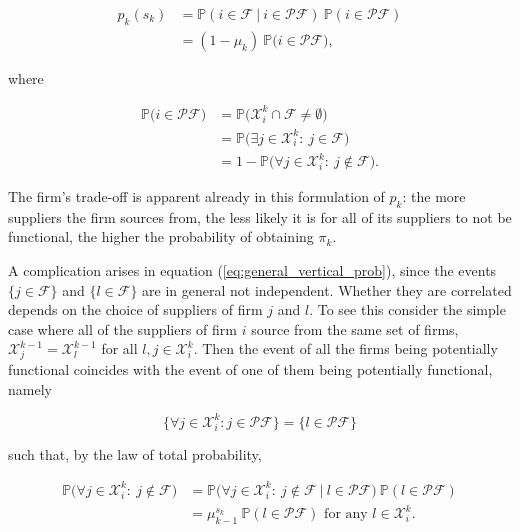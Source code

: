 \documentclass[american, abstract=on]{scrartcl}
\newcommand{\F}{\mathcal{F}}
\newcommand{\X}{\mathcal{X}}
\newcommand{\PF}{\mathcal{P} \F}
\renewcommand{\P}{\mathbb{P}}
\begin{document}
\begin{equation}
  \begin{split}
    p_k(s_k) &= \P(i \in \F \ \vert \ i \in \PF) \ \P(i \in \PF) \\
    &= (1 - \mu_k) \ \P\Big( i \in \PF \Big),
  \end{split}
\end{equation}

where

\begin{equation} \label{eq:general_vertical_prob}
  \begin{split}
    \P\Big( i \in \PF \Big) &= \P\Big( \X^k_i \cap \F  \neq \emptyset \Big) \\
    &= \P\Big( \exists j \in \X^k_i: \ j \in \F \Big) \\ 
    &= 1 - \P\Big(\forall j \in \X^k_i: \ j \notin \F \Big).
  \end{split}
\end{equation}

The firm's trade-off is apparent already in this formulation of $p_k$: the more suppliers the firm sources from, the less likely it is for all of its suppliers to not be functional, the higher the probability of obtaining $\pi_k$. 

A complication arises in equation (\ref{eq:general_vertical_prob}), since the events $\{j \in \F \}$ and $\{l \in \F\}$ are in general not independent. Whether they are correlated depends on the choice of suppliers of firm $j$ and $l$. To see this consider the simple case where all of the suppliers of firm $i$ source from the same set of firms, $\X^{k-1}_j = \X^{k-1}_l$ for all $l, j \in \X^k_i$. Then the event of all the firms being potentially functional coincides with the event of one of them being potentially functional, namely

\begin{equation}
  \{\forall j \in \X^k_i: j \in \PF \} = \{l \in \PF\}
\end{equation}

such that, by the law of total probability,

\begin{equation}
  \begin{split}
    \P\Big(\forall j \in \X^k_i: \ j \notin \F \Big) &= \P\Big(\forall j \in \X^k_i: \ j \notin \F \ \vert \ l \in \PF \Big) \ \P(l \in \PF) \\
    &= \mu^{s_k}_{k-1} \ \P(l \in \PF) \text{ for any } l \in \X^k_i.
  \end{split}
\end{equation}
\end{document}
